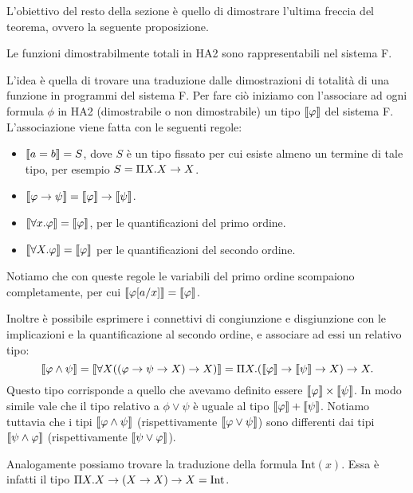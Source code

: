 \documentclass[]{marticle}
\begin{document}
L'obiettivo del resto della sezione \`e quello di dimostrare l'ultima freccia
del teorema, ovvero la seguente proposizione.
\begin{block}[Proposizione]
    Le funzioni dimostrabilmente totali in HA2 sono rappresentabili nel sistema
    F.
\end{block}

L'idea \`e quella di trovare una traduzione dalle dimostrazioni di totalit\`a di
una funzione in programmi del sistema F. Per fare ci\`o iniziamo con
l'associare ad ogni formula $\phi$ in HA2 (dimostrabile o non dimostrabile) un
tipo $\llbracket \varphi \rrbracket$ del sistema F. L'associazione viene fatta con le seguenti
regole:
\begin{itemize}
    \item $\llbracket a=b \rrbracket = S$, dove $S$ \`e un tipo fissato per cui esiste almeno un
        termine di tale tipo, per esempio $S=\Pi X.X\rightarrow X$.
    \item $\llbracket \varphi\rightarrow\psi \rrbracket=\llbracket \varphi \rrbracket\rightarrow\llbracket \psi \rrbracket$.
    \item $\llbracket \forall x.\varphi \rrbracket=\llbracket \varphi \rrbracket$, per le quantificazioni del primo
        ordine.
    \item $\llbracket \forall X.\varphi \rrbracket=\llbracket \varphi \rrbracket$ per le quantificazioni del secondo
        ordine.
\end{itemize}

Notiamo che con queste regole le variabili del primo ordine scompaiono
completamente, per cui $\llbracket \varphi[a/x] \rrbracket=\llbracket \varphi \rrbracket$.

Inoltre \`e possibile esprimere i connettivi di congiunzione e disgiunzione con
le implicazioni e la quantificazione al secondo ordine, e associare ad essi un
relativo tipo:
\[
    \llbracket \varphi\land\psi \rrbracket=\llbracket \forall X((\varphi\rightarrow\psi\rightarrow X)\rightarrow X) \rrbracket = \Pi X
    .(\llbracket \varphi \rrbracket\rightarrow\llbracket \psi \rrbracket \rightarrow X)\rightarrow X.
\]
Questo tipo corrisponde a quello che avevamo definito essere $\llbracket \varphi \rrbracket \times
\llbracket \psi \rrbracket$. In modo simile vale che il tipo relativo a $\phi \lor \psi$ \`e
uguale al tipo $\llbracket \varphi \rrbracket+\llbracket \psi \rrbracket$. Notiamo tuttavia che i tipi $\llbracket 
\varphi\land\psi \rrbracket$ (rispettivamente $\llbracket \varphi\lor\psi \rrbracket$) sono differenti dai tipi
$\llbracket  \psi\land\varphi \rrbracket$ (rispettivamente $\llbracket \psi\lor\varphi \rrbracket$).

Analogamente possiamo trovare la traduzione della formula $\text{Int}(x)$. Essa
\`e infatti il tipo $\Pi X. X\rightarrow(X\rightarrow X)\rightarrow X = \text{Int}$.
\end{document}
